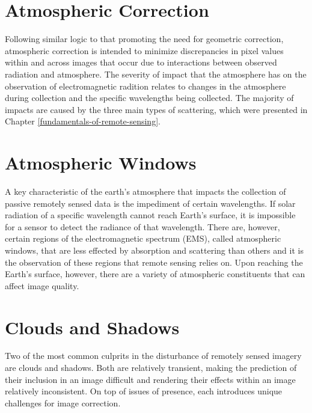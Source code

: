 \documentclass[
]{book}
\begin{document}
\hypertarget{atmospheric-correction}{%
\section{Atmospheric Correction}\label{atmospheric-correction}}

Following similar logic to that promoting the need for geometric
correction, atmospheric correction is intended to minimize discrepancies
in pixel values within and across images that occur due to interactions
between observed radiation and atmosphere. The severity of impact that
the atmosphere has on the observation of electromagnetic radition
relates to changes in the atmosphere during collection and the specific
wavelengths being collected. The majority of impacts are caused by the
three main types of scattering, which were presented in Chapter
\ref{fundamentals-of-remote-sensing}.

\hypertarget{atmospheric-windows}{%
\section{Atmospheric Windows}\label{atmospheric-windows}}

A key characteristic of the earth's atmosphere that impacts the
collection of passive remotely sensed data is the impediment of certain
wavelengths. If solar radiation of a specific wavelength cannot reach
Earth's surface, it is impossible for a sensor to detect the radiance of
that wavelength. There are, however, certain regions of the
electromagnetic spectrum (EMS), called atmospheric windows, that are
less effected by absorption and scattering than others and it is the
observation of these regions that remote sensing relies on. Upon
reaching the Earth's surface, however, there are a variety of
atmospheric constituents that can affect image quality.

\hypertarget{clouds-and-shadows}{%
\section{Clouds and Shadows}\label{clouds-and-shadows}}

Two of the most common culprits in the disturbance of remotely sensed
imagery are clouds and shadows. Both are relatively transient, making
the prediction of their inclusion in an image difficult and rendering
their effects within an image relatively inconsistent. On top of issues
of presence, each introduces unique challenges for image correction.
\end{document}
